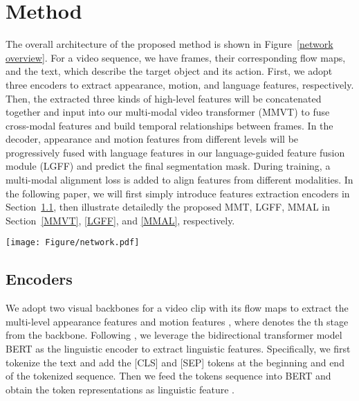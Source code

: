 \documentclass[10pt,twocolumn,letterpaper]{article}
\begin{document}
\section{Method} 
\vspace{-2mm}
The overall architecture of the proposed method is shown in Figure~\ref{network overview}. For a video sequence, we have  frames, their corresponding flow maps, and the text, which describe the target object and its action. First, we adopt three encoders to extract appearance, motion, and language features, respectively. Then, the extracted three kinds of high-level features will be concatenated together and input into our multi-modal video transformer (MMVT) to fuse cross-modal features and build temporal relationships between frames. In the decoder, appearance and motion features from different levels will be progressively fused with language features in our language-guided feature fusion module (LGFF) and predict the final segmentation mask. During training, a multi-modal alignment loss is added to align features from different modalities. In the following paper, we will first simply introduce features extraction encoders in Section~\ref{Encoders}, then illustrate detailedly the proposed MMT, LGFF, MMAL in Section~\ref{MMVT}, \ref{LGFF}, and \ref{MMAL}, respectively. 


\begin{figure*}[!t]
  \centering
  \texttt{[image: Figure/network.pdf]}\caption{Overview of the proposed model. MMVT: Multi-modal video transformer. CMA: Cross-modal attention. TA: Temporal attention. LGFF: Language-guided feature fusion. "B+M" is the baseline model with motion information, details about which can be found in \ref{albation study}. Here, we do not show the multi-modal alignment loss for simplification.}
  \label{network overview}
  \vspace{-6mm}
\end{figure*}





\vspace{-2mm}
\subsection{Encoders} \label{Encoders}
\vspace{-2mm}
We adopt two visual backbones for a video clip with its flow maps to extract the multi-level appearance features  and motion features , where  denotes the th stage from the backbone. Following \cite{bellver2020refvos}, we leverage the bidirectional transformer model BERT \cite{devlin2018bert} as the linguistic encoder to extract linguistic features. Specifically, we first tokenize the text and add the [CLS] and [SEP] tokens at the beginning and end of the tokenized sequence. Then we feed the tokens sequence into BERT and obtain the token representations as linguistic feature . 
\end{document}
